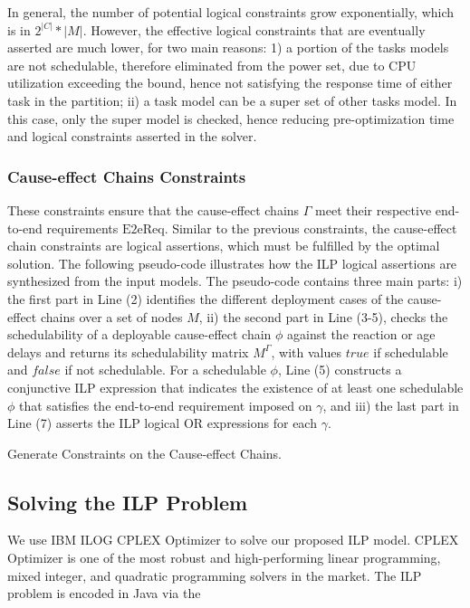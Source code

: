 In general, the number of potential logical constraints grow exponentially, which is in $2^{|C|}*|M|$. However, the effective logical constraints that are eventually asserted are much lower, for two main reasons: 1) a portion of the tasks models are not schedulable, therefore eliminated from the power set, due to CPU utilization exceeding the bound, hence not satisfying the response time of either task in the partition; ii) a task model can be a super set of other tasks model. In this case, only the super model is checked, hence reducing pre-optimization time and logical constraints asserted in the solver.

\subsubsection*{Cause-effect Chains Constraints}
These constraints ensure that the cause-effect chains $\Gamma$ meet their respective end-to-end requirements $\mathrm{E2eReq}$. Similar to the previous constraints, the cause-effect chain constraints are logical assertions, which must be fulfilled by the optimal solution. The following pseudo-code illustrates how the ILP logical assertions are synthesized from the input models. 
The pseudo-code contains three main parts: i) the first part in Line (2) identifies the different deployment cases of the cause-effect chains over a set of nodes $M$, ii) the second part in Line (3-5), checks the schedulability of a deployable cause-effect chain $\phi$ against the reaction or age delays  \cite{mubeen2013support} and returns its schedulability matrix $M^\Gamma$, with values $true$ if schedulable and $false$ if not schedulable. For a schedulable $\phi$, Line (5) constructs a conjunctive ILP expression that indicates the existence of at least one schedulable $\phi$ that satisfies the end-to-end requirement imposed on $\gamma$, and iii) the last part in Line (7) asserts the ILP logical OR expressions for each $\gamma$.
\begin{algorithm}
\caption{Generate Constraints on the Cause-effect Chains.}\label{alg_causeeffectchains}
\end{algorithm}\vspace{-0.2cm}

\subsection{Solving the ILP Problem}
We use IBM ILOG CPLEX Optimizer to solve our proposed ILP model. CPLEX Optimizer is one of the most robust and high-performing linear programming, mixed integer, and quadratic programming solvers in the market. The ILP problem is encoded in Java via the 
